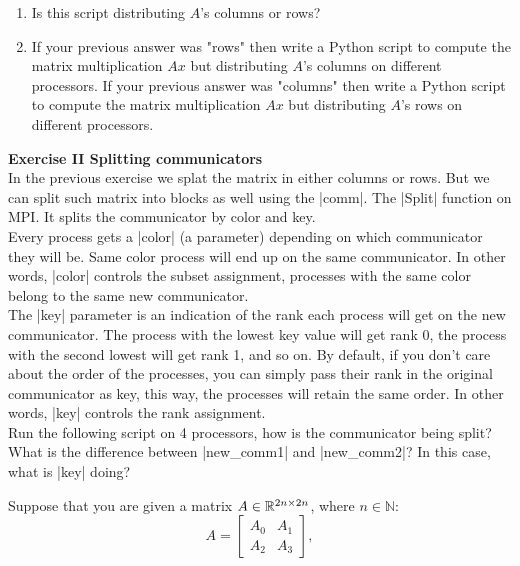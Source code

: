 \documentclass[11pt]{article}
\begin{document}


\begin{enumerate}
    \item Is this script distributing $A$'s columns or rows?
    \item If your previous answer was "rows" then write a Python script to compute the matrix multiplication $Ax$ but distributing $A$'s columns on different processors. If your previous answer was "columns" then write a Python script to compute the matrix multiplication $Ax$ but distributing $A$'s rows on different processors. 
\end{enumerate}

\bigskip

{\bf{Exercise II Splitting communicators}}\\

In the previous exercise we splat the matrix in either columns or rows. But we can split such matrix into blocks as well using the |comm|. The |Split| function on MPI. It splits the communicator by color and key. \\

Every process gets a |color| (a parameter) depending on which communicator they will be. Same color process will end up on the same communicator. In other words, |color| controls the subset assignment, processes with the same color belong to the same new communicator. \\

The |key| parameter is an indication of the rank each process will get on the new communicator. The process with the lowest key value will get rank 0, the process with the second lowest will get rank 1, and so on. By default, if you don't care about the order of the processes, you can simply pass their rank in the original communicator as key, this way, the processes will retain the same order. In other words, |key| controls the rank assignment.\\

Run the following script on 4 processors, how is the communicator being split? What is the difference between |new_comm1| and |new_comm2|? In this case, what is |key| doing?

 
 
 Suppose that you are given a matrix $A \in \mathbb{R}^{2n \times 2n}$, where $n \in \mathbb{N}$:
 \[ A = \begin{bmatrix} A_{0} & A_{1} \\ A_{2} & A_{3} \end{bmatrix},\]
 
\end{document}
